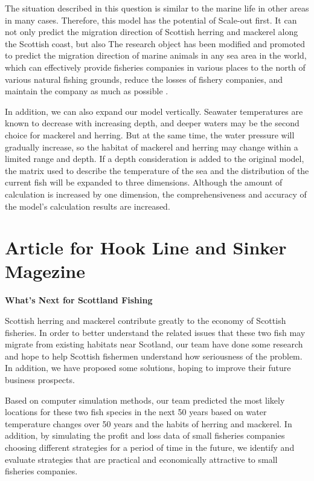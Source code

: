 \documentclass{mcmthesis}
\numberwithin{figure}{section}
\numberwithin{table}{section}
\begin{document}
The situation described in this question is similar to the marine life in other areas in many cases. Therefore, this model has the potential of Scale-out first. It can not only predict the migration direction of Scottish herring and mackerel along the Scottish coast, but also The research object has been modified and promoted to predict the migration direction of marine animals in any sea area in the world, which can effectively provide fisheries companies in various places to the north of various natural fishing grounds, reduce the losses of fishery companies, and maintain the company as much as possible .

In addition, we can also expand our model vertically. Seawater temperatures are known to decrease with increasing depth, and deeper waters may be the second choice for mackerel and herring. But at the same time, the water pressure will gradually increase, so the habitat of mackerel and herring may change within a limited range and depth. If a depth consideration is added to the original model, the matrix used to describe the temperature of the sea and the distribution of the current fish will be expanded to three dimensions. Although the amount of calculation is increased by one dimension, the comprehensiveness and accuracy of the model's calculation results are increased. 
\newpage
\section{Article for Hook Line and Sinker Magezine}
\begin{center}
\textbf{What's Next for Scottland Fishing}
\end{center}

Scottish herring and mackerel contribute greatly to the economy of Scottish fisheries. In order to better understand the related issues that these two fish may migrate from existing habitats near Scotland, our team have done some research and hope to help Scottish fishermen understand how seriousness of  the problem. In addition, we have proposed some solutions, hoping to improve their future business prospects.

Based on computer simulation methods, our team predicted the most likely locations for these two fish species in the next 50 years based on water temperature changes over 50 years and the habits of herring and mackerel. In addition, by simulating the profit and loss data of small fisheries companies choosing different strategies for a period of time in the future, we identify and evaluate strategies that are practical and economically attractive to small fisheries companies.
\end{document}
